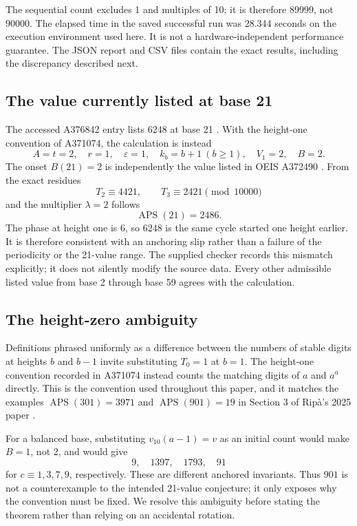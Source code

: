 \documentclass[11pt,letterpaper]{article}
\numberwithin{equation}{section}
\theoremstyle{definition}
\newcommand{\APS}{\operatorname{APS}}
\begin{document}
The sequential count excludes 1 and multiples of 10; it is therefore $89999$,
not $90000$. The elapsed time in the saved successful run was 28.344 seconds
on the execution environment used here. It is not a hardware-independent
performance guarantee. The JSON report and CSV files contain the exact
results, including the discrepancy described next.

\subsection{The value currently listed at base 21}
The accessed A376842 entry lists $6248$ at base 21 \cite{oeis842}. With the
height-one convention of A371074, the calculation is instead
\begin{equation}\label{eq:21calc}
 A=t=2,\quad r=1,\quad\varepsilon=1,\quad
 k_b=b+1\ (b\geq1),\quad V_1=2,\quad B=2.
\end{equation}
The onset $B(21)=2$ is independently the value listed in OEIS A372490
\cite{oeis2490}. From the exact residues
\[
 T_2\equiv4421,\qquad T_3\equiv2421\pmod {10000}
\]
and the multiplier $\lambda=2$ follows
\begin{equation}\label{eq:21answer}
 \APS(21)=2486.
\end{equation}
The phase at height one is 6, so $6248$ is the same cycle started one height
earlier. It is therefore consistent with an anchoring slip rather than a
failure of the periodicity or the 21-value range. The supplied checker records
this mismatch explicitly; it does not silently modify the source data.
Every other admissible listed value from base 2 through base 59 agrees with
the calculation.

\subsection{The height-zero ambiguity}
Definitions phrased uniformly as a difference between the numbers of stable
digits at heights $b$ and $b-1$ invite substituting $T_0=1$ at $b=1$.
The height-one convention recorded in A371074 instead counts the matching
digits of $a$ and $a^a$ directly. This is the convention used throughout this
paper, and it matches the examples $\APS(301)=3971$ and $\APS(901)=19$ in
Section 3 of Rip\`a's 2025 paper \cite{ripa2025}.

For a balanced base, substituting $v_{10}(a-1)=v$ as an initial count would
make $B=1$, not 2, and would give
\[
 9,\quad1397,\quad1793,\quad91
\]
for $c\equiv1,3,7,9$, respectively. These are different anchored invariants.
Thus $901$ is not a counterexample to the intended 21-value conjecture; it
only exposes why the convention must be fixed. We resolve this ambiguity
before stating the theorem rather than relying on an accidental rotation.
\end{document}

